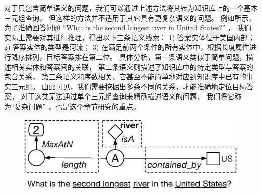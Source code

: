 对于只包含简单语义的问题，我们可以通过上述方法将其转为知识库上的一个基本三元组查询，
但这样的方法并不适用于其它具有更复杂语义的问题。
例如所示，为了准确回答问题
``What is the second longest river in United States?'' ，
我们实际上需要对其进行推理，得出以下三条语义线索：
1) 答案实体位于美国内部；
2) 答案实体的类型是河流；
3) 在满足前两个条件的所有实体中，根据长度属性进行降序排列，目标答案排在第二位。
具体分析，第一条语义类似于简单问题，描述相关实体和答案间的关联，
第二条语义则描述了知识库中的特定类型与答案的包含关系，
第三条语义和序数相关，它甚至不能简单地对应到知识库中已有的事实三元组。
由此可见，我们需要挖掘出多条不同的关系，才能准确地定位目标答案。
对于这类无法通过单个三元组查询来精确描述语义的问题，
我们将它称为``{复杂问题}'' ，也是这个章节研究的重点。

\begin{figure}[ht]
	\centering
    \includegraphics[width=0.7\columnwidth]{figure/compqa/intro.eps}
	\label{fig:compqa-intro}
\end{figure}






